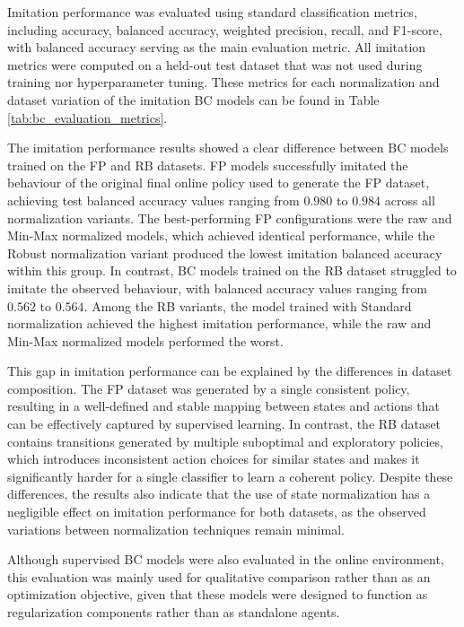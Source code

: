 Imitation performance was evaluated using standard classification metrics, including accuracy, balanced accuracy, weighted precision, recall, and F1-score, with balanced accuracy serving as the main evaluation metric. All imitation metrics were computed on a held-out test dataset that was not used during training nor hyperparameter tuning. These metrics for each normalization and dataset variation of the imitation BC models can be found in Table \ref{tab:bc_evaluation_metrics}.


The imitation performance results showed a clear difference between BC models trained on the FP and RB datasets. FP models successfully imitated the behaviour of the original final online policy used to generate the FP dataset, achieving test balanced accuracy values ranging from $0.980$ to $0.984$ across all normalization variants. The best-performing FP configurations were the raw and Min-Max normalized models, which achieved identical performance, while the Robust normalization variant produced the lowest imitation balanced accuracy within this group. In contrast, BC models trained on the RB dataset struggled to imitate the observed behaviour, with balanced accuracy values ranging from $0.562$ to $0.564$. Among the RB variants, the model trained with Standard normalization achieved the highest imitation performance, while the raw and Min-Max normalized models performed the worst. 

This gap in imitation performance can be explained by the differences in dataset composition. The FP dataset was generated by a single consistent policy, resulting in a well-defined and stable mapping between states and actions that can be effectively captured by supervised learning. In contrast, the RB dataset contains transitions generated by multiple suboptimal and exploratory policies, which introduces inconsistent action choices for similar states and makes it significantly harder for a single classifier to learn a coherent policy. Despite these differences, the results also indicate that the use of state normalization has a negligible effect on imitation performance for both datasets, as the observed variations between normalization techniques remain minimal.

Although supervised BC models were also evaluated in the online environment, this evaluation was mainly used for qualitative comparison rather than as an optimization objective, given that these models were designed to function as regularization components rather than as standalone agents.




